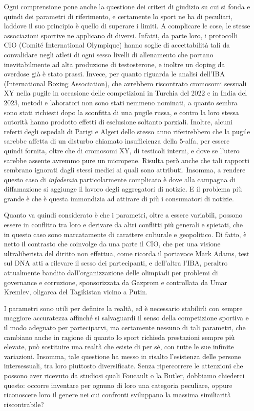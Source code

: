 \documentclass[
  letterpaper,
  DIV=11,
  numbers=noendperiod]{scrartcl}
\begin{document}
Ogni comprensione pone anche la questione dei criteri di giudizio su cui
si fonda e quindi dei parametri di riferimento, e certamente lo sport ne
ha di peculiari, laddove il suo principio è quello di superare i limiti.
A complicare le cose, le stesse associazioni sportive ne applicano di
diversi. Infatti, da parte loro, i protocolli CIO (Comité International
Olympique) hanno soglie di accettabilità tali da convalidare negli
atleti di ogni sesso livelli di allenamento che portano inevitabilmente
ad alta produzione di testosterone, e inoltre un doping da overdose già
è stato prassi. Invece, per quanto riguarda le analisi dell'IBA
(International Boxing Association), che avrebbero riscontrato cromosomi
sessuali XY nella pugile in occasione delle competizioni in Turchia del
2022 e in India del 2023, metodi e laboratori non sono stati nemmeno
nominati, a quanto sembra sono stati richiesti dopo la sconfitta di una
pugile russa, e contro la loro stessa autorità hanno prodotto effetti di
esclusione soltanto parziali. Inoltre, alcuni referti degli ospedali di
Parigi e Algeri dello stesso anno riferirebbero che la pugile sarebbe
affetta di un disturbo chiamato insufficienza della 5-alfa, per essere
quindi fornita, oltre che di cromosomi XY, di testicoli interni, e dove
se l'utero sarebbe assente avremmo pure un micropene. Risulta però anche
che tali rapporti sembrano ignorati dagli stessi medici ai quali sono
attributi. Insomma, a rendere questo caso di \emph{infodemia}
particolarmente complicato è dove alla campagna di diffamazione si
aggiunge il lavoro degli aggregatori di notizie. E il problema più
grande è che è questa immondizia ad attirare di più i consumatori di
notizie.

Quanto va quindi considerato è che i parametri, oltre a essere
variabili, possono essere in conflitto tra loro e derivare da altri
conflitti più generali e spietati, che in questo caso sono marcatamente
di carattere culturale e geopolitico. Di fatto, è netto il contrasto che
coinvolge da una parte il CIO, che per una visione ultraliberista del
diritto non effettua, come ricorda il portavoce Mark Adams, test sul DNA
atti a rilevare il sesso dei partecipanti, e dell'altra l'IBA, peraltro
attualmente bandito dall'organizzazione delle olimpiadi per problemi di
governance e corruzione, sponsorizzata da Gazprom e controllata da Umar
Kremlev, oligarca del Tagikistan vicino a Putin.

I parametri sono utili per definire la realtà, ed è necessario
stabilirli con sempre maggiore accuratezza affinché si salvaguardi il
senso della competizione sportiva e il modo adeguato per parteciparvi,
ma certamente nessuno di tali parametri, che cambiano anche in ragione
di quanto lo sport richieda prestazioni sempre più elevate, può
sostituire una realtà che esiste di per sè, con tutte le sue infinite
variazioni. Insomma, tale questione ha messo in risalto l'esistenza
delle persone intersessuali, tra loro piuttosto diversificate. Senza
ripercorrere le attenzioni che possono aver ricevuto da studiosi quali
Foucault o la Butler, dobbiamo chiederci questo: occorre inventare per
ognuno di loro una categoria peculiare, oppure riconoscere loro il
genere nei cui confronti sviluppano la massima similiarità
riscontrabile?
\end{document}
